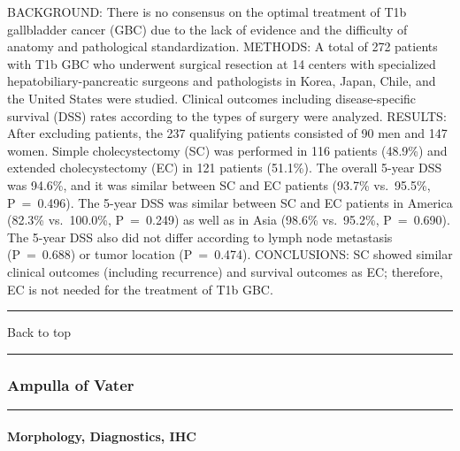 \documentclass[]{article}
\let\oldparagraph\paragraph
\renewcommand{\paragraph}[1]{\oldparagraph{#1}\mbox{}}
\begin{document}
BACKGROUND: There is no consensus on the optimal treatment of T1b
gallbladder cancer (GBC) due to the lack of evidence and the difficulty
of anatomy and pathological standardization. METHODS: A total of 272
patients with T1b GBC who underwent surgical resection at 14 centers
with specialized hepatobiliary-pancreatic surgeons and pathologists in
Korea, Japan, Chile, and the United States were studied. Clinical
outcomes including disease-specific survival (DSS) rates according to
the types of surgery were analyzed. RESULTS: After excluding patients,
the 237 qualifying patients consisted of 90 men and 147 women. Simple
cholecystectomy (SC) was performed in 116 patients (48.9\%) and extended
cholecystectomy (EC) in 121 patients (51.1\%). The overall 5-year DSS
was 94.6\%, and it was similar between SC and EC patients (93.7\%
vs.~95.5\%, P~=~0.496). The 5-year DSS was similar between SC and EC
patients in America (82.3\% vs.~100.0\%, P~=~0.249) as well as in Asia
(98.6\% vs.~95.2\%, P~=~0.690). The 5-year DSS also did not differ
according to lymph node metastasis (P~=~0.688) or tumor location
(P~=~0.474). CONCLUSIONS: SC showed similar clinical outcomes (including
recurrence) and survival outcomes as EC; therefore, EC is not needed for
the treatment of T1b GBC.

{}

{}

\begin{center}\rule{0.5\linewidth}{\linethickness}\end{center}

Back to top

\begin{center}\rule{0.5\linewidth}{\linethickness}\end{center}

\pagebreak

\hypertarget{ampulla-of-vater}{%
\subsubsection{Ampulla of Vater}\label{ampulla-of-vater}}

\begin{center}\rule{0.5\linewidth}{\linethickness}\end{center}

\hypertarget{morphology-diagnostics-ihc-3}{%
\paragraph{Morphology, Diagnostics,
IHC}\label{morphology-diagnostics-ihc-3}}
\end{document}
